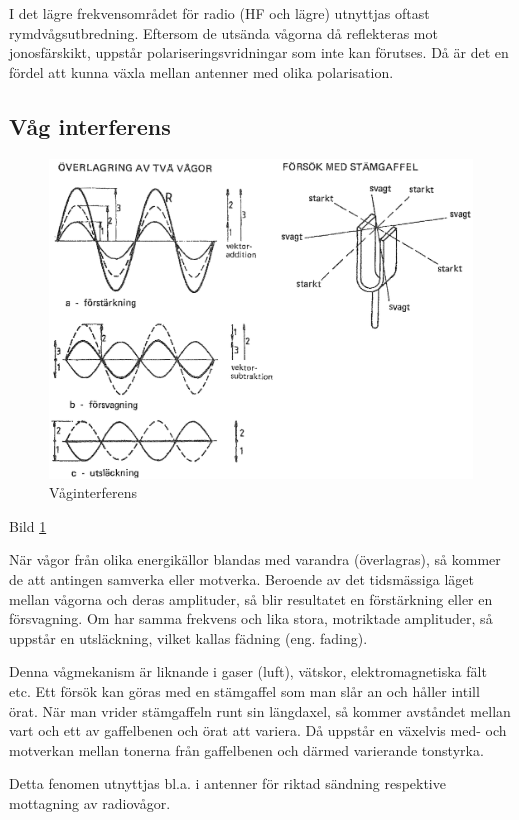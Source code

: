 I det lägre frekvensområdet för radio (HF och lägre) utnyttjas oftast
rymdvågsutbredning. Eftersom de utsända vågorna då reflekteras mot
jonosfärskikt, uppstår polariseringsvridningar som inte kan förutses. Då är det
en fördel att kunna växla mellan antenner med olika polarisation.

\subsection{Våg interferens}

\begin{figure}
  \includegraphics[width=\textwidth]{images/cropped_pdfs/bild_2_1-15.pdf}
  \caption{Våginterferens}
  \label{fig:BildII1-15}
\end{figure}

Bild \ref{fig:BildII1-15}

När vågor från olika energikällor blandas med varandra (överlagras), så kommer
de att antingen samverka eller motverka. Beroende av det tidsmässiga läget
mellan vågorna och deras amplituder, så blir resultatet en förstärkning eller
en försvagning. Om har samma frekvens och lika stora, motriktade amplituder, så
uppstår en utsläckning, vilket kallas fädning (eng. fading).

Denna vågmekanism är liknande i gaser (luft), vätskor, elektromagnetiska fält
etc. Ett försök kan göras med en stämgaffel som man slår an och håller intill
örat. När man vrider stämgaffeln runt sin längdaxel, så kommer avståndet mellan
vart och ett av gaffelbenen och örat att variera. Då uppstår en växelvis med-
och motverkan mellan tonerna från gaffelbenen och därmed varierande tonstyrka.

Detta fenomen utnyttjas bl.a. i antenner för riktad sändning respektive
mottagning av radiovågor.
